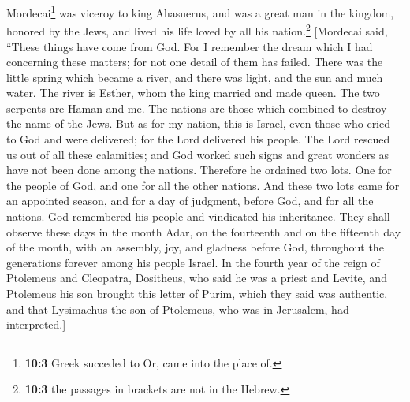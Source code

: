  Mordecai\footnote{\textbf{10:3} Greek succeded to Or,
  came into the place of.} was viceroy to king Ahasuerus, and was a
great man in the kingdom, honored by the Jews, and lived his life loved
by all his nation.\footnote{\textbf{10:3} the passages in brackets are
  not in the Hebrew.}  {[}Mordecai said, ``These things
have come from God.  For I remember the dream which I had
concerning these matters; for not one detail of them has failed.
 There was the little spring which became a river, and
there was light, and the sun and much water. The river is Esther, whom
the king married and made queen.  The two serpents are
Haman and me.  The nations are those which combined to
destroy the name of the Jews.  But as for my nation, this
is Israel, even those who cried to God and were delivered; for the Lord
delivered his people. The Lord rescued us out of all these calamities;
and God worked such signs and great wonders as have not been done among
the nations.  Therefore he ordained two lots. One for the
people of God, and one for all the other nations.  And
these two lots came for an appointed season, and for a day of judgment,
before God, and for all the nations.  God remembered his
people and vindicated his inheritance.  They shall
observe these days in the month Adar, on the fourteenth and on the
fifteenth day of the month, with an assembly, joy, and gladness before
God, throughout the generations forever among his people Israel.
 In the fourth year of the reign of Ptolemeus and
Cleopatra, Dositheus, who said he was a priest and Levite, and Ptolemeus
his son brought this letter of Purim, which they said was authentic, and
that Lysimachus the son of Ptolemeus, who was in Jerusalem, had
interpreted.{]}
